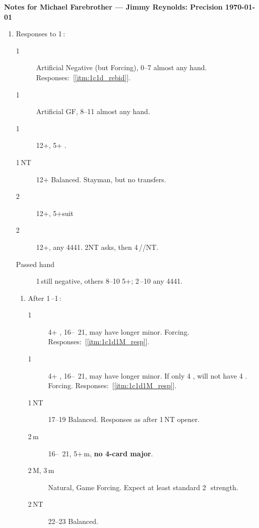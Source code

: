 \documentclass[12pt]{article}
\begin{document}
\newcommand{\additionaltikz}{%
%
} %
\drawconventioncard

\newpage
\centerline{\large\textbf{Notes for Michael Farebrother --- Jimmy Reynolds: Precision \today{}}}
\begin{footnotesize}
    \begin{enumerate}
        \item \label{itm:1c_resp}Responses to 1\,\bc:
        \begin{description}
            \item [1\,\rd] Artificial Negative (but Forcing), 0--7 almost any hand.
                Responses:~[\ref{itm:1c1d_rebid}].
            \item [1\,\rh] Artificial GF, 8--11 almost any hand.
            \item [1\,\bs] 12+, 5+ \bs.
            \item [1\,NT] 12+ Balanced.
                Stayman, but no transfers.
            \item [2\,\,\rh] 12+, 5+suit
            \item [2\,\bs] 12+, any 4441.
                2NT asks, then 4\,\bc/\rd/NT\@.
            \item[Passed hand] 1\,\rd still negative, others 8--10 5+; 2\,--10 any 4441.
        \end{description}
        \begin{enumerate}[label*=\arabic*,nosep]
            \item \label{itm:1c1d_rebid} After 1\,\bc--1\,\rd:
            \begin{description}
                \item [1\,\rh] 4+ \rh, 16--~21, may have longer minor.
                    Forcing.
                    Responses:~[\ref{itm:1c1d1M_resp}].
                \item [1\,\bs] 4+ \bs, 16--~21, may have longer minor.
                If only 4 \bs, will not have 4 \rh.
                    Forcing.
                    Responses:~[\ref{itm:1c1d1M_resp}].
                \item [1\,NT] 17--19 Balanced.
                    Responses as after 1\,NT opener.
                \item [2\,m] 16--~21, 5+\,m, \textbf{no 4-card major}.
                \item [2\,M, 3\,m] Natural, Game Forcing.
                    Expect at least standard 2\,\bc\ strength.
                \item [2\,NT] 22--23 Balanced.

\end{description}
\end{enumerate}
\end{enumerate}
\end{footnotesize}
\end{document}
